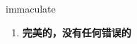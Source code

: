 
\begin{frame}
{\huge immaculate}
\begin{center}
\begin{enumerate}\Large
  \item \textbf{完美的，没有任何错误的}
\end{enumerate}
\end{center}
\end{frame}
